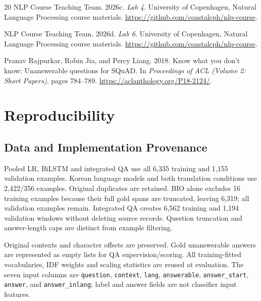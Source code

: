 \documentclass[11pt]{article}
\begin{document}
\begin{thebibliography}{20}
NLP Course Teaching Team. 2026c. \textit{Lab 4}. University of Copenhagen, Natural Language Processing course materials. \url{https://github.com/coastalcph/nlp-course}.

NLP Course Teaching Team. 2026d. \textit{Lab 6}. University of Copenhagen, Natural Language Processing course materials. \url{https://github.com/coastalcph/nlp-course}.

Pranav Rajpurkar, Robin Jia, and Percy Liang. 2018. Know what you don't know: Unanswerable questions for SQuAD. In \textit{Proceedings of ACL (Volume 2: Short Papers)}, pages 784--789. \url{https://aclanthology.org/P18-2124/}.
\end{thebibliography}

\clearpage
\nobalance
\setcounter{topnumber}{5}
\setcounter{bottomnumber}{5}
\setcounter{totalnumber}{10}
\setcounter{dbltopnumber}{3}
\renewcommand{\topfraction}{.95}
\renewcommand{\bottomfraction}{.95}
\renewcommand{\textfraction}{.05}
\renewcommand{\floatpagefraction}{.8}
\renewcommand{\dbltopfraction}{.95}
\renewcommand{\dblfloatpagefraction}{.8}
\appendix
\section{Reproducibility}
\subsection{Data and Implementation Provenance}
Pooled LR, BiLSTM and integrated QA use all 6,335 training and 1,155 validation examples. Korean language models and both translation conditions use 2,422/356 examples. Original duplicates are retained. BIO alone excludes 16 training examples because their full gold spans are truncated, leaving 6,319; all validation examples remain. Integrated QA creates 6,562 training and 1,194 validation windows without deleting source records. Question truncation and answer-length caps are distinct from example filtering.

Original contexts and character offsets are preserved. Gold unanswerable answers are represented as empty lists for QA supervision/scoring. All training-fitted vocabularies, IDF weights and scaling statistics are reused at evaluation. The seven input columns are \texttt{question}, \texttt{context}, \texttt{lang}, \texttt{answerable}, \texttt{answer\_start}, \texttt{answer}, and \texttt{answer\_inlang}; label and answer fields are not classifier input features.
\end{document}
